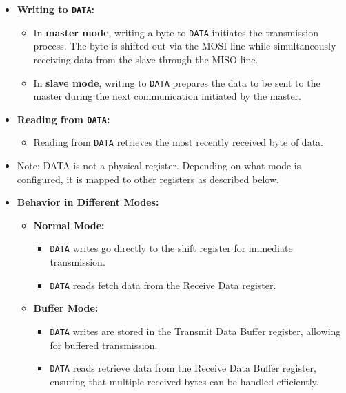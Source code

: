   \begin{itemize}
      \item \textbf{Writing to \texttt{DATA}:}
      \begin{itemize}
          \item In \textbf{master mode}, writing a byte to \texttt{DATA} initiates the transmission process. The byte is shifted out via the MOSI line while simultaneously receiving data from the slave through the MISO line.
          \item In \textbf{slave mode}, writing to \texttt{DATA} prepares the data to be sent to the master during the next communication initiated by the master.
      \end{itemize}
      
      \item \textbf{Reading from \texttt{DATA}:}
      \begin{itemize}
          \item Reading from \texttt{DATA} retrieves the most recently received byte of data.
      \end{itemize}
      
      \item Note: DATA is not a physical register. Depending on what mode is configured, it is mapped to other registers as described below.

      \item \textbf{Behavior in Different Modes:}
      \begin{itemize}
          \item \textbf{Normal Mode:}
          \begin{itemize}
              \item \texttt{DATA} writes go directly to the shift register for immediate transmission.
              \item \texttt{DATA} reads fetch data from the Receive Data register.
          \end{itemize}
          \item \textbf{Buffer Mode:}
          \begin{itemize}
              \item \texttt{DATA} writes are stored in the Transmit Data Buffer register, allowing for buffered transmission.
              \item \texttt{DATA} reads retrieve data from the Receive Data Buffer register, ensuring that multiple received bytes can be handled efficiently.
          \end{itemize}
      \end{itemize}
  \end{itemize}
  
